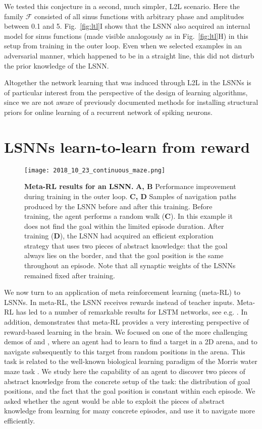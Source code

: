 \documentclass{article} \pdfoutput=1
\begin{document}
We tested this conjecture in a second, much simpler, L2L scenario.
Here the family $\mathcal{F}$ consisted of all sinus functions with arbitrary phase and amplitudes between 0.1 and 5. Fig.~\ref{fig:ltl}I shows that the LSNN also acquired an internal model for sinus functions (made visible analogously as in Fig.~\ref{fig:ltl}H) in this setup from training in the outer loop.  
Even when we selected examples in an adversarial manner, which happened to be in a straight line, this did not disturb the prior knowledge of the LSNN.




Altogether the network learning that was induced through L2L in the LSNNs is of particular interest from the perspective of the design of learning algorithms, since we are not aware of previously documented methods for installing structural priors 
for online learning of a recurrent network of spiking neurons.



\section{LSNNs learn-to-learn from reward}\label{sec:meta-RL}

\begin{figure}
	\texttt{[image: 2018\_10\_23\_continuous\_maze.png]}
\caption{\textbf{Meta-RL results for an LSNN.}  \textbf{A, B} Performance improvement during
training in the outer loop. \textbf{C, D} Samples of navigation paths produced by the LSNN before and after this training.
Before training, the agent performs a random walk (\textbf{C}).
In this example it does not find the goal within the limited episode duration.
After training (\textbf{D}), the LSNN had acquired an efficient exploration strategy that uses two pieces of abstract knowledge:
that the goal always lies on the border, and that the goal position is the same throughout an episode. Note that all synaptic weights of the LSNNs remained fixed after training.
} 
\label{fig:maze} 
\end{figure}

We now turn to an application of meta reinforcement learning (meta-RL) to LSNNs. In meta-RL, the LSNN receives rewards instead of teacher inputs.
Meta-RL has led to a
number of remarkable results for LSTM networks, see e.g. \cite{wang2016learning,duan2016rl}. In
addition, \cite{WangETAL:18} demonstrates that meta-RL provides a very interesting
perspective of reward-based learning in the brain. We focused on one of the
more challenging demos of \cite{wang2016learning} and \cite{duan2016rl}, where an agent had
to learn to find a target in a 2D arena, and to navigate subsequently to this target from
random positions in the arena.
This task is related to the well-known biological learning paradigm of the Morris water maze task \cite{morris1984developments,vasilaki2009spike}.
We study here the capability of an agent to discover two pieces of abstract knowledge from the concrete setup of the task: the distribution of goal positions, and the fact that the goal position is constant within each episode.
We asked whether the agent would be able to exploit the pieces of abstract knowledge from learning for many concrete episodes, and use it to navigate more efficiently.
\end{document}
